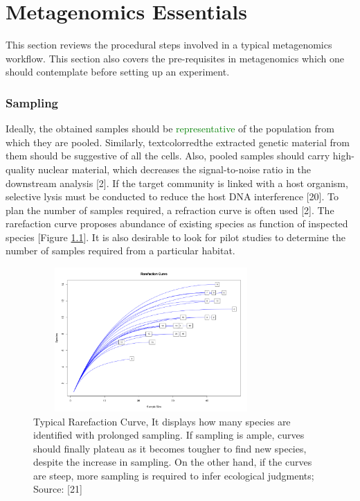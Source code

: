 \chapter{Metagenomics Essentials}
 \setcounter{page}{4}

This section reviews the procedural steps involved in a typical metagenomics workflow. This section also covers the pre-requisites in metagenomics which one should contemplate before setting up an experiment.

\subsection{Sampling}
Ideally, the obtained samples should be \textcolor{green}{representative} of the population from which they are pooled. Similarly, textcolor{red}{the extracted genetic material from them should be suggestive of all the cells.} Also, pooled samples should carry high-quality nuclear material, which decreases the signal-to-noise ratio in the downstream analysis [2]. If the target community is linked with a host organism, selective lysis must be conducted to reduce the host DNA interference [20]. To plan the number of samples required, a refraction curve is often used [2]. The rarefaction curve proposes abundance of existing species as function of inspected species [Figure \ref{fig:figure1}]. It is also desirable to look for pilot studies to determine the number of samples required from a particular habitat.

\begin{figure}
  \centering
  \includegraphics[width=9cm, height=5.5cm] {../figures/Figure1.png}
  \caption{Typical Rarefaction Curve, It displays how many species are identified with prolonged sampling. If sampling is ample, curves should finally plateau as it becomes tougher to find new species, despite the increase in sampling. On the other hand, if the curves are steep, more sampling is required to infer ecological judgments; Source: [21]}
  \label{fig:figure1}
\end{figure}

